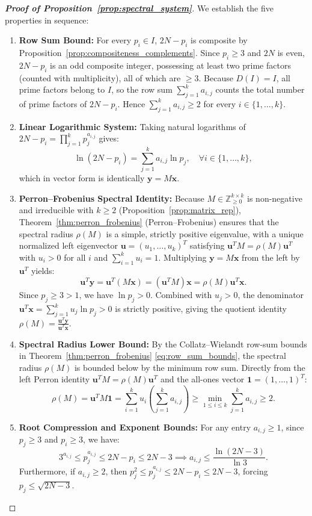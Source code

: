 \documentclass[11pt,a4paper]{article}
\theoremstyle{definition}
\begin{document}
\begin{proof}[\textbf{Proof of Proposition~\ref{prop:spectral_system}}]
We establish the five properties in sequence:
\begin{enumerate}
    \item \textbf{Row Sum Bound:} For every $p_i \in I$, $2N - p_i$ is composite by Proposition~\ref{prop:compositeness_complements}. Since $p_i \ge 3$ and $2N$ is even, $2N - p_i$ is an odd composite integer, possessing at least two prime factors (counted with multiplicity), all of which are $\ge 3$. Because $D(I) = I$, all prime factors belong to $I$, so the row sum $\sum_{j=1}^k a_{i,j}$ counts the total number of prime factors of $2N - p_i$. Hence $\sum_{j=1}^k a_{i,j} \ge 2$ for every $i \in \{1, \dots, k\}$.
    \item \textbf{Linear Logarithmic System:} Taking natural logarithms of $2N - p_i = \prod_{j=1}^k p_j^{a_{i,j}}$ gives:
    \[
    \ln(2N - p_i) = \sum_{j=1}^k a_{i,j} \ln p_j, \quad \forall i \in \{1, \dots, k\},
    \]
    which in vector form is identically $\mathbf{y} = M \mathbf{x}$.
    \item \textbf{Perron--Frobenius Spectral Identity:} Because $M \in \mathbb{Z}_{\ge 0}^{k \times k}$ is non-negative and irreducible with $k \ge 2$ (Proposition~\ref{prop:matrix_rep}), Theorem~\ref{thm:perron_frobenius} (Perron--Frobenius) ensures that the spectral radius $\rho(M)$ is a simple, strictly positive eigenvalue, with a unique normalized left eigenvector $\mathbf{u} = (u_1, \dots, u_k)^T$ satisfying $\mathbf{u}^T M = \rho(M) \mathbf{u}^T$ with $u_i > 0$ for all $i$ and $\sum_{i=1}^k u_i = 1$. Multiplying $\mathbf{y} = M \mathbf{x}$ from the left by $\mathbf{u}^T$ yields:
    \[
    \mathbf{u}^T \mathbf{y} = \mathbf{u}^T (M \mathbf{x}) = (\mathbf{u}^T M) \mathbf{x} = \rho(M) \mathbf{u}^T \mathbf{x}.
    \]
    Since $p_j \ge 3 > 1$, we have $\ln p_j > 0$. Combined with $u_j > 0$, the denominator $\mathbf{u}^T \mathbf{x} = \sum_{j=1}^k u_j \ln p_j > 0$ is strictly positive, giving the quotient identity $\rho(M) = \frac{\mathbf{u}^T \mathbf{y}}{\mathbf{u}^T \mathbf{x}}$.
    \item \textbf{Spectral Radius Lower Bound:} By the Collatz--Wielandt row-sum bounds in Theorem~\ref{thm:perron_frobenius} \eqref{eq:row_sum_bounds}, the spectral radius $\rho(M)$ is bounded below by the minimum row sum. Directly from the left Perron identity $\mathbf{u}^T M = \rho(M) \mathbf{u}^T$ and the all-ones vector $\mathbf{1} = (1, \dots, 1)^T$:
    \[
    \rho(M) = \mathbf{u}^T M \mathbf{1} = \sum_{i=1}^k u_i \left(\sum_{j=1}^k a_{i,j}\right) \ge \min_{1 \le i \le k} \sum_{j=1}^k a_{i,j} \ge 2.
    \]
    \item \textbf{Root Compression and Exponent Bounds:} For any entry $a_{i,j} \ge 1$, since $p_j \ge 3$ and $p_i \ge 3$, we have:
    \[
    3^{a_{i,j}} \le p_j^{a_{i,j}} \le 2N - p_i \le 2N - 3 \implies a_{i,j} \le \frac{\ln(2N - 3)}{\ln 3}.
    \]
    Furthermore, if $a_{i,j} \ge 2$, then $p_j^2 \le p_j^{a_{i,j}} \le 2N - p_i \le 2N - 3$, forcing $p_j \le \sqrt{2N - 3}$.
\end{enumerate}
\end{proof}
\end{document}
